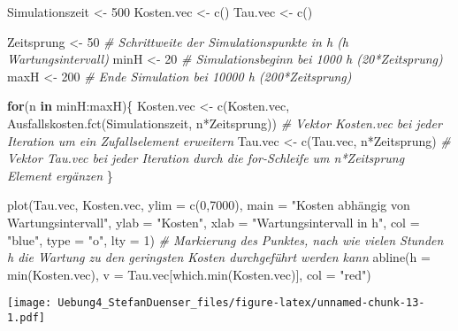 \documentclass[
]{article}
\newenvironment{Shaded}{\begin{snugshade}}{\end{snugshade}}
\newcommand{\AttributeTok}[1]{\textcolor[rgb]{0.77,0.63,0.00}{#1}}
\newcommand{\CommentTok}[1]{\textcolor[rgb]{0.56,0.35,0.01}{\textit{#1}}}
\newcommand{\ControlFlowTok}[1]{\textcolor[rgb]{0.13,0.29,0.53}{\textbf{#1}}}
\newcommand{\DecValTok}[1]{\textcolor[rgb]{0.00,0.00,0.81}{#1}}
\newcommand{\FunctionTok}[1]{\textcolor[rgb]{0.00,0.00,0.00}{#1}}
\newcommand{\NormalTok}[1]{#1}
\newcommand{\OtherTok}[1]{\textcolor[rgb]{0.56,0.35,0.01}{#1}}
\newcommand{\SpecialCharTok}[1]{\textcolor[rgb]{0.00,0.00,0.00}{#1}}
\newcommand{\StringTok}[1]{\textcolor[rgb]{0.31,0.60,0.02}{#1}}
\begin{document}
\begin{Shaded}
\begin{Highlighting}[]
\NormalTok{Simulationszeit }\OtherTok{\textless{}{-}} \DecValTok{500}
\NormalTok{Kosten.vec }\OtherTok{\textless{}{-}} \FunctionTok{c}\NormalTok{()}
\NormalTok{Tau.vec }\OtherTok{\textless{}{-}} \FunctionTok{c}\NormalTok{()}

\NormalTok{Zeitsprung }\OtherTok{\textless{}{-}} \DecValTok{50}    \CommentTok{\# Schrittweite der Simulationspunkte in h (h Wartungsintervall)}
\NormalTok{minH }\OtherTok{\textless{}{-}} \DecValTok{20}          \CommentTok{\# Simulationsbeginn bei 1000 h (20*Zeitsprung)}
\NormalTok{maxH }\OtherTok{\textless{}{-}} \DecValTok{200}         \CommentTok{\# Ende Simulation bei 10000 h (200*Zeitsprung)}


\ControlFlowTok{for}\NormalTok{(n }\ControlFlowTok{in}\NormalTok{ minH}\SpecialCharTok{:}\NormalTok{maxH)\{}
\NormalTok{  Kosten.vec }\OtherTok{\textless{}{-}} \FunctionTok{c}\NormalTok{(Kosten.vec, }\FunctionTok{Ausfallskosten.fct}\NormalTok{(Simulationszeit, n}\SpecialCharTok{*}\NormalTok{Zeitsprung))  }\CommentTok{\# Vektor Kosten.vec bei jeder Iteration um ein Zufallselement erweitern}
\NormalTok{  Tau.vec }\OtherTok{\textless{}{-}} \FunctionTok{c}\NormalTok{(Tau.vec, n}\SpecialCharTok{*}\NormalTok{Zeitsprung)     }\CommentTok{\# Vektor Tau.vec bei jeder Iteration durch die for{-}Schleife um n*Zeitsprung Element ergänzen}
\NormalTok{\}}

\FunctionTok{plot}\NormalTok{(Tau.vec, Kosten.vec, }\AttributeTok{ylim =} \FunctionTok{c}\NormalTok{(}\DecValTok{0}\NormalTok{,}\DecValTok{7000}\NormalTok{), }\AttributeTok{main =} \StringTok{"Kosten abhängig von Wartungsintervall"}\NormalTok{, }\AttributeTok{ylab =} \StringTok{"Kosten"}\NormalTok{, }\AttributeTok{xlab =} \StringTok{"Wartungsintervall in h"}\NormalTok{, }\AttributeTok{col =} \StringTok{"blue"}\NormalTok{, }\AttributeTok{type =} \StringTok{"o"}\NormalTok{, }\AttributeTok{lty =} \DecValTok{1}\NormalTok{)}
\CommentTok{\# Markierung des Punktes, nach wie vielen Stunden h die Wartung zu den geringsten Kosten durchgeführt werden kann}
\FunctionTok{abline}\NormalTok{(}\AttributeTok{h =} \FunctionTok{min}\NormalTok{(Kosten.vec), }\AttributeTok{v =}\NormalTok{ Tau.vec[}\FunctionTok{which.min}\NormalTok{(Kosten.vec)], }\AttributeTok{col =} \StringTok{"red"}\NormalTok{)}
\end{Highlighting}
\end{Shaded}

\texttt{[image: Uebung4\_StefanDuenser\_files/figure-latex/unnamed-chunk-13-1.pdf]}
\end{document}
